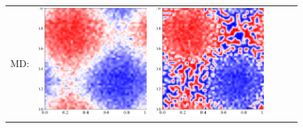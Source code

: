 \documentclass[12pt, reqno]{report}
\theoremstyle{definition}
\theoremstyle{remark}
\begin{document}
\begin{figure}[H]
\begin{tabular}{rccccc}
        MD: & 
        \includegraphics[align = c, height=\subheight]{media_paper/AC_cmap_MD_n=0.png} & 
        \includegraphics[align = c, height=\subheight]{media_paper/AC_cmap_MD_n=50.png} & 

\end{tabular}
\end{figure}
\end{document}
